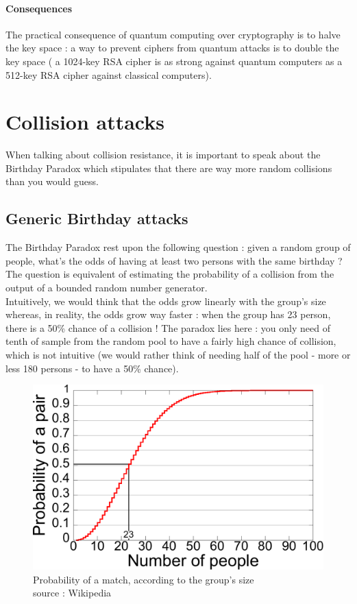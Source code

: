 \paragraph{ Consequences } 
The practical consequence of quantum computing over cryptography is to halve the key space : a way to prevent ciphers from quantum attacks is to double the key space ( a 1024-key RSA cipher is as strong against quantum computers as a 512-key RSA cipher against classical computers).


\section{Collision attacks}

When talking about collision resistance, it is important to speak about the Birthday Paradox which stipulates that there are way more random collisions than you would guess.

\subsection{Generic Birthday attacks}

The Birthday Paradox rest upon the following question : given a random group of people, what's the odds of having at least two persons with the same birthday ? The question is equivalent of estimating the probability of a collision from the output of a bounded random number generator.\\

Intuitively, we would think that the odds grow linearly with the group's size whereas, in reality, the odds grow way faster : when the group has 23 person, there is a 50\% chance of a collision ! The paradox lies here : you only need of tenth of sample from the random pool to have a fairly high chance of collision, which is not intuitive (we would rather think of needing half of the pool - more or less 180 persons -  to have a 50\% chance).

\begin{figure}[ht!]
    \centering
   	\includegraphics[width=\textwidth]{images/Birthday_Paradox.pdf}
	\caption{Probability of a match, according to the group's size \\ source : Wikipedia}
	\label{fig:BirthdayParadox}
\end{figure}

